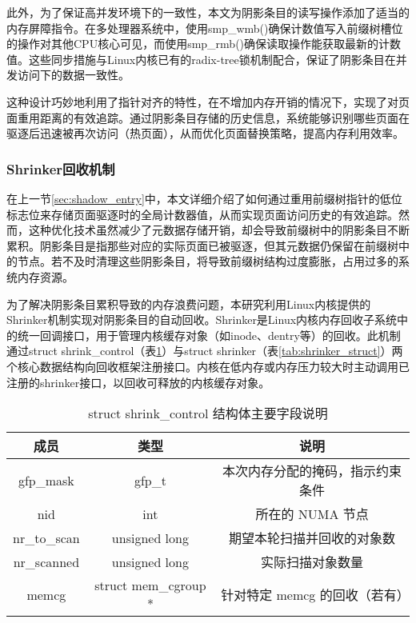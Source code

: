 此外，为了保证高并发环境下的一致性，本文为阴影条目的读写操作添加了适当的内存屏障指令。在多处理器系统中，使用smp\_wmb()确保计数值写入前缀树槽位的操作对其他CPU核心可见，而使用smp\_rmb()确保读取操作能获取最新的计数值。这些同步措施与Linux内核已有的radix-tree锁机制配合，保证了阴影条目在并发访问下的数据一致性。

这种设计巧妙地利用了指针对齐的特性，在不增加内存开销的情况下，实现了对页面重用距离的有效追踪。通过阴影条目存储的历史信息，系统能够识别哪些页面在驱逐后迅速被再次访问（热页面），从而优化页面替换策略，提高内存利用效率。


\subsubsection{Shrinker回收机制}

在上一节\ref{sec:shadow_entry}中，本文详细介绍了如何通过重用前缀树指针的低位标志位来存储页面驱逐时的全局计数器值，从而实现页面访问历史的有效追踪。然而，这种优化技术虽然减少了元数据存储开销，却会导致前缀树中的阴影条目不断累积。阴影条目是指那些对应的实际页面已被驱逐，但其元数据仍保留在前缀树中的节点。若不及时清理这些阴影条目，将导致前缀树结构过度膨胀，占用过多的系统内存资源。

为了解决阴影条目累积导致的内存浪费问题，本研究利用Linux内核提供的Shrinker机制实现对阴影条目的自动回收。Shrinker是Linux内核内存回收子系统中的统一回调接口，用于管理内核缓存对象（如inode、dentry等）的回收。此机制通过struct shrink\_control（表\ref{tab:shrink_control_struct}）与struct shrinker（表\ref{tab:shrinker_struct}）两个核心数据结构向回收框架注册接口。内核在低内存或内存压力较大时主动调用已注册的shrinker接口，以回收可释放的内核缓存对象。

\begin{table}[htbp]
  \centering
  \caption{struct shrink\_control 结构体主要字段说明}
  \label{tab:shrink_control_struct}
  \begin{tabular}{ccc}
    \toprule
    \textbf{成员} & \textbf{类型} & \textbf{说明} \\
    \midrule
    gfp\_mask & gfp\_t & 本次内存分配的掩码，指示约束条件 \\
    nid & int & 所在的 NUMA 节点 \\
    nr\_to\_scan & unsigned long & 期望本轮扫描并回收的对象数 \\
    nr\_scanned & unsigned long & 实际扫描对象数量 \\
    memcg & struct mem\_cgroup * & 针对特定 memcg 的回收（若有） \\
    \bottomrule
  \end{tabular}
\end{table}

